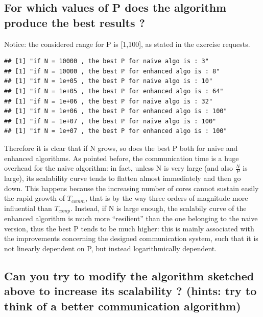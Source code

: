 \documentclass[
  10pt,
]{article}
\begin{document}
\hypertarget{for-which-values-of-p-does-the-algorithm-produce-the-best-results}{%
\subsection{For which values of P does the algorithm produce the best
results
?}\label{for-which-values-of-p-does-the-algorithm-produce-the-best-results}}

Notice: the considered range for P is {[}1,100{]}, as stated in the
exercise requests.

\begin{verbatim}
## [1] "if N = 10000 , the best P for naive algo is : 3"
## [1] "if N = 10000 , the best P for enhanced algo is : 8"
## [1] "if N = 1e+05 , the best P for naive algo is : 10"
## [1] "if N = 1e+05 , the best P for enhanced algo is : 64"
## [1] "if N = 1e+06 , the best P for naive algo is : 32"
## [1] "if N = 1e+06 , the best P for enhanced algo is : 100"
## [1] "if N = 1e+07 , the best P for naive algo is : 100"
## [1] "if N = 1e+07 , the best P for enhanced algo is : 100"
\end{verbatim}

Therefore it is clear that if N grows, so does the best P both for naive
and enhanced algorithms. As pointed before, the communication time is a
huge overhead for the naive algorithm: in fact, unless N is very large
(and also \(\frac{N}{P}\) is large), its scalability curve tends to
flatten almost immediately and then go down. This happens because the
increasing number of cores cannot sustain easily the rapid growth of
\(T_{comm}\), that is by the way three orders of magnitude more
influential than \(T_{comp}\). Instead, if N is large enough, the
scalabily curve of the enhanced algorithm is much more ``resilient''
than the one belonging to the naive version, thus the best P tends to be
much higher: this is mainly associated with the improvements concerning
the designed communication system, such that it is not linearly
dependent on P, but instead logarithmically dependent.

\hypertarget{can-you-try-to-modify-the-algorithm-sketched-above-to-increase-its-scalability-hints-try-to-think-of-a-better-communication-algorithm}{%
\subsection{Can you try to modify the algorithm sketched above to
increase its scalability ? (hints: try to think of a better
communication
algorithm)}\label{can-you-try-to-modify-the-algorithm-sketched-above-to-increase-its-scalability-hints-try-to-think-of-a-better-communication-algorithm}}
\end{document}
